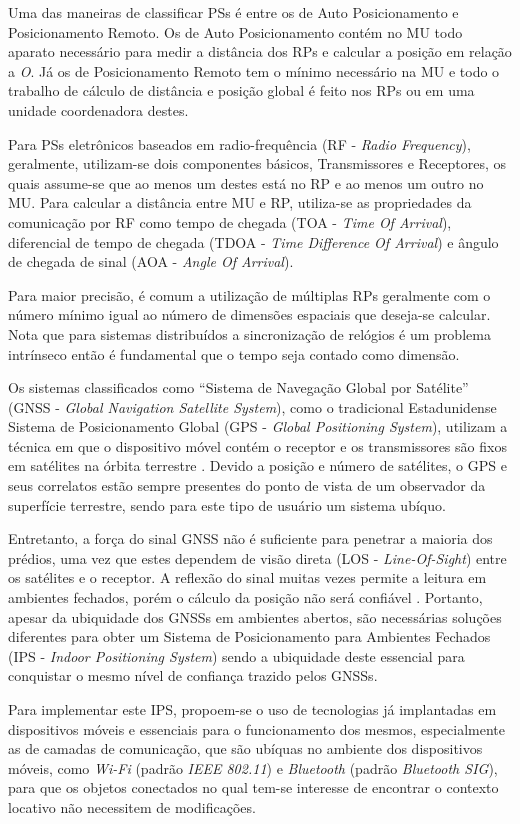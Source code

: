 Uma das maneiras de classificar PSs é entre os de Auto Posicionamento e
Posicionamento Remoto. Os de Auto Posicionamento contém no MU todo aparato
necessário para medir a distância dos RPs e calcular a posição em relação a
\textit{O}. Já os de Posicionamento Remoto tem o mínimo necessário na MU e todo
o trabalho de cálculo de distância e posição global é feito nos RPs ou em uma
unidade coordenadora destes.

Para PSs eletrônicos baseados em radio-frequência (RF - \textit{Radio
Frequency}), geralmente, utilizam-se dois componentes básicos, Transmissores e
Receptores, os quais assume-se que ao menos um destes está no RP e ao menos um
outro no MU. Para calcular a distância entre MU e RP, utiliza-se as propriedades
da comunicação por RF como tempo de chegada (TOA - \textit{Time Of Arrival}),
diferencial de tempo de chegada (TDOA - \textit{Time Difference Of Arrival}) e
ângulo de chegada de sinal (AOA - \textit{Angle Of Arrival}).

Para maior precisão, é comum a utilização de múltiplas RPs geralmente com o
número mínimo igual ao número de dimensões espaciais que deseja-se calcular.
Nota que para sistemas distribuídos a sincronização de relógios é um problema
intrínseco então é fundamental que o tempo seja contado como dimensão.

Os sistemas classificados como ``Sistema de Navegação Global por Satélite''
(GNSS - \textit{Global Navigation Satellite System}), como o tradicional
Estadunidense Sistema de Posicionamento Global (GPS - \textit{Global Positioning
System}), utilizam a técnica em que o dispositivo móvel contém o receptor e os
transmissores são fixos em satélites na órbita terrestre \cite{Djuknic2001}.
Devido a posição e número de satélites, o GPS e seus correlatos estão sempre
presentes do ponto de vista de um observador da superfície terrestre, sendo para
este tipo de usuário um sistema ubíquo.

Entretanto, a força do sinal GNSS não é suficiente para penetrar a maioria dos
prédios, uma vez que estes dependem de visão direta (LOS -
\textit{Line-Of-Sight}) entre os satélites e o receptor. A reflexão do sinal
muitas vezes permite a leitura em ambientes fechados, porém o cálculo da posição
não será confiável \cite{Chen2000}. Portanto, apesar da ubiquidade dos
GNSSs em ambientes abertos, são necessárias soluções diferentes para obter um
Sistema de Posicionamento para Ambientes Fechados (IPS - \textit{Indoor
Positioning System}) sendo a ubiquidade deste essencial para conquistar o mesmo
nível de confiança trazido pelos GNSSs.

Para implementar este IPS, propoem-se o uso de tecnologias já implantadas em
dispositivos móveis e essenciais para o funcionamento dos mesmos, especialmente
as de camadas de comunicação, que são ubíquas no ambiente dos dispositivos
móveis, como 	\textit{Wi-Fi} (padrão \textit{IEEE 802.11}) e \textit{Bluetooth} (padrão
\textit{Bluetooth SIG}), para que os objetos conectados no qual tem-se interesse
de encontrar o contexto locativo não necessitem de modificações.
